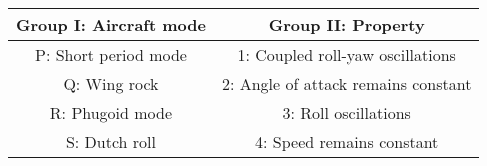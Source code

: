 \begin{tabular}[12pt]{ |c| c| } 
    \hline
    {Group I: Aircraft mode} & {Group II: Property}\\ 
    \hline
    P: Short period mode & 1: Coupled roll-yaw oscillations\\
    \hline 
    Q: Wing rock & 2: Angle of attack remains constant \\
    \hline
    R: Phugoid mode & 3: Roll oscillations \\
    \hline   
    S: Dutch roll & 4: Speed remains constant\\
    \hline
\end{tabular}
